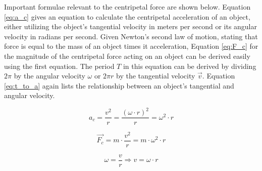Important formulae relevant to the centripetal force are shown below. Equation \ref{eq:a_c} gives an equation to calculate the centripetal acceleration of an object, either utilizing the object's tangential velocity in meters per second or its angular velocity in radians per second. Given Newton's second law of motion, stating that force is equal to the mass of an object times it acceleration, Equation \ref{eq:F_c} for the magnitude of the centripetal force acting on an object can be derived easily using the first equation. The period $T$ in this equation can be derived by dividing $2 \pi$ by the angular velocity $\omega$ or $2 \pi r$ by the tangential velocity $\vec{v}$. Equation \ref{eq:t_to_a} again lists the relationship between an object's tangential and angular velocity.

\begin{equation}
	a_c = \frac{v^2}{r} = \frac{(\omega \cdot r)^2}{r} = \omega^2 \cdot r
	\label{eq:a_c}
\end{equation}

\begin{equation}
	\vec{F_c} = m \cdot \frac{v^2}{r} = m \cdot \omega^2 \cdot r
	\label{eq:F_c}
\end{equation}

\begin{equation}
	\omega = \frac{v}{r} \Rightarrow v = \omega \cdot r
	\label{eq:t_to_a}
\end{equation}


